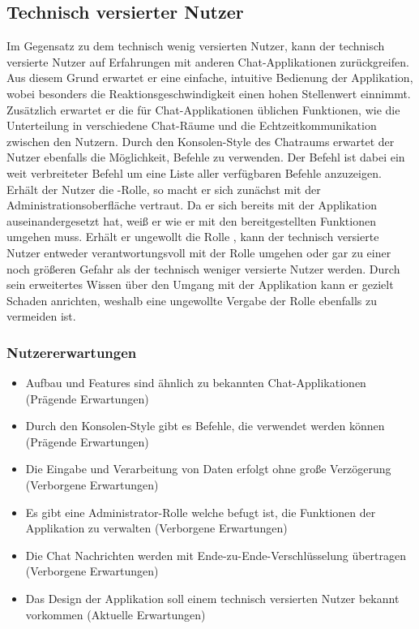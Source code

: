 \subsection{Technisch versierter Nutzer}
Im Gegensatz zu dem technisch wenig versierten Nutzer, kann der technisch versierte Nutzer auf Erfahrungen mit anderen Chat-Applikationen zurückgreifen.
Aus diesem Grund erwartet er eine einfache, intuitive Bedienung der Applikation, wobei besonders die Reaktionsgeschwindigkeit einen hohen Stellenwert einnimmt.
Zusätzlich erwartet er die für Chat-Applikationen üblichen Funktionen, wie die Unterteilung in verschiedene Chat-Räume und die Echtzeitkommunikation zwischen den Nutzern.
\newparagraph
Durch den Konsolen-Style des Chatraums erwartet der Nutzer ebenfalls die Möglichkeit, Befehle zu verwenden.
Der Befehl  ist dabei ein weit verbreiteter Befehl um eine Liste aller verfügbaren Befehle anzuzeigen.
\newparagraph
Erhält der Nutzer die -Rolle, so macht er sich zunächst mit der Administrationsoberfläche vertraut.
Da er sich bereits mit der Applikation auseinandergesetzt hat, weiß er wie er mit den bereitgestellten Funktionen umgehen muss.
Erhält er ungewollt die Rolle , kann der technisch versierte Nutzer entweder verantwortungsvoll mit der Rolle umgehen oder gar zu einer noch größeren Gefahr als der technisch weniger versierte Nutzer werden.
Durch sein erweitertes Wissen über den Umgang mit der Applikation kann er gezielt Schaden anrichten, weshalb eine ungewollte Vergabe der Rolle ebenfalls zu vermeiden ist.

\subsubsection{Nutzererwartungen}
\begin{itemize}
  \item Aufbau und Features sind ähnlich zu bekannten Chat-Applikationen (Prägende Erwartungen)
  \item Durch den Konsolen-Style gibt es Befehle, die verwendet werden können (Prägende Erwartungen)
  \item Die Eingabe und Verarbeitung von Daten erfolgt ohne große Verzögerung (Verborgene Erwartungen)
  \item Es gibt eine Administrator-Rolle welche befugt ist, die Funktionen der Applikation zu verwalten (Verborgene Erwartungen)
  \item Die Chat Nachrichten werden mit Ende-zu-Ende-Verschlüsselung übertragen (Verborgene Erwartungen)
  \item Das Design der Applikation soll einem technisch versierten Nutzer bekannt vorkommen (Aktuelle Erwartungen)
\end{itemize}

